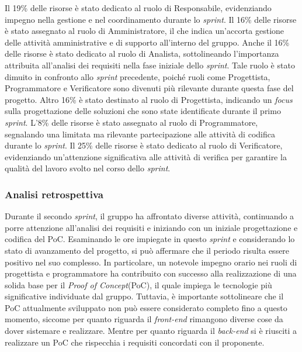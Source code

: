 Il 19\% delle risorse è stato dedicato al ruolo di Responsabile, evidenziando impegno nella gestione e nel coordinamento durante lo \textit{sprint}.
Il 16\% delle risorse è stato assegnato al ruolo di Amministratore, il che indica un'accorta gestione delle attività amministrative
e di supporto all'interno del gruppo.
Anche il 16\% delle risorse è stato dedicato al ruolo di Analista, sottolineando l'importanza attribuita all'analisi
dei requisiti nella fase iniziale dello \textit{sprint}. Tale ruolo è stato dimuito in confronto allo \textit{sprint} precedente, poiché ruoli come Progettista,
Programmatore e Verificatore sono divenuti più rilevante durante questa fase del progetto.
Altro 16\% è stato destinato al ruolo di Progettista, indicando un \textit{focus} sulla progettazione delle soluzioni che sono state identificate durante il primo \textit{sprint}.
L'8\% delle risorse è stato assegnato al ruolo di Programmatore, segnalando una limitata ma rilevante partecipazione alle
attività di codifica durante lo \textit{sprint}.
Il 25\% delle risorse è stato dedicato al ruolo di Verificatore, evidenziando un'attenzione significativa alle attività di
verifica per garantire la qualità del lavoro svolto nel corso dello \textit{sprint}.

\subsubsection{Analisi retrospettiva}

Durante il secondo \textit{sprint}, il gruppo ha affrontato diverse attività,
continuando a porre attenzione all'analisi dei requisiti e iniziando con un
iniziale progettazione e codifica del PoC.
Esaminando le ore impiegate in questo \textit{sprint} e considerando lo stato di avanzamento del progetto, si può affermare che il periodo risulta essere positivo nel suo complesso.
In particolare, un notevole impegno orario nei ruoli di progettista e programmatore ha contribuito con successo alla realizzazione di una solida base per il \textit{Proof of Concept}\g (PoC),
il quale impiega le tecnologie più significative individuate dal gruppo. Tuttavia, è importante sottolineare che il PoC attualmente sviluppato non può
essere considerato completo fino a questo momento, siccome per quanto riguarda il \textit{front-end} rimangono diverse cose da dover sistemare e realizzare.
Mentre per quanto riguarda il \textit{back-end} si è riusciti a realizzare un PoC che rispecchia i requisiti concordati con il proponente.


